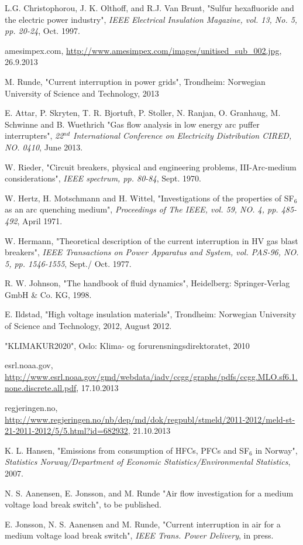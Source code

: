 \documentclass[10pt,a4paper,twoside]{article}
\begin{document}
\cleardoublepage
\begin{thebibliography}{10}
 L.G. Christophorou, J. K. Olthoff, and R.J. Van Brunt, "Sulfur hexafluoride and the electric power industry", \textit{IEEE Electrical Insulation Magazine, vol. 13, No. 5, pp. 20-24}, Oct. 1997.

 amesimpex.com, \url{http://www.amesimpex.com/images/unitised_sub_002.jpg}, 26.9.2013

 M. Runde, "Current interruption in power grids", Trondheim: Norwegian University of Science and Technology, 2013

 E. Attar, P. Skryten, T. R. Bjortuft, P. Stoller, N. Ranjan, O. Granhaug, M. Schwinne and B. Wuethrich "Gas flow analysis in low energy arc puffer interrupters", \textit{22$^{nd}$ International Conference on Electricity Distribution CIRED, NO. 0410}, June 2013.

 W. Rieder, "Circuit breakers, physical and engineering problems, III-Arc-medium considerations", \textit{IEEE spectrum, pp. 80-84}, Sept. 1970.

 W. Hertz, H. Motschmann and H. Wittel, "Investigations of the properties of SF$_6$ as an arc quenching medium", \textit{Proceedings of The IEEE, vol. 59, NO. 4, pp. 485-492}, April 1971.

 W. Hermann, "Theoretical description of the current interruption in HV gas blast breakers", \textit{IEEE Transactions on Power Apparatus and System, vol. PAS-96, NO. 5, pp. 1546-1555}, Sept./ Oct. 1977.

 R. W. Johnson, "The handbook of fluid dynamics", Heidelberg: Springer-Verlag GmbH \& Co. KG, 1998.

 E. Ildstad, "High voltage insulation materials", Trondheim: Norwegian University of Science and Technology, 2012, August 2012.

 "KLIMAKUR2020", Oslo: Klima- og forurensningsdirektoratet, 2010

 esrl.noaa.gov, \url{http://www.esrl.noaa.gov/gmd/webdata/iadv/ccgg/graphs/pdfs/ccgg.MLO.sf6.1.none.discrete.all.pdf}, 17.10.2013

 regjeringen.no, \url{http://www.regjeringen.no/nb/dep/md/dok/regpubl/stmeld/2011-2012/meld-st-21-2011-2012/5/5.html?id=682932}, 21.10.2013

 K. L. Hansen, "Emissions from consumption of HFCs, PFCs and SF$_6$ in Norway", \textit{Statistics Norway/Department of Economic Statistics/Environmental Statistics}, 2007.

 N. S. Aanensen, E. Jonsson, and M. Runde "Air flow investigation for a medium voltage load break switch", to be published.

 E. Jonsson, N. S. Aanensen and M. Runde, "Current interruption in air for a medium voltage load break switch", \textit{IEEE Trans. Power Delivery}, in press.

\end{thebibliography}
\end{document}
